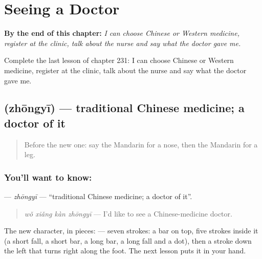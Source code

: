 
\chapter{Seeing a Doctor}
\label{ch:zh-seeing-a-doctor}

\begin{chapteropening}
\textbf{By the end of this chapter:} \emph{I can choose Chinese or Western medicine, register at the clinic, talk about the nurse and say what the doctor gave me.}

Complete the last lesson of chapter 231: I can choose Chinese or Western medicine, register at the clinic, talk about the nurse and say what the doctor gave me.
\end{chapteropening}

\section[\texorpdfstring{\zh{中医} (zhōngyī)}{中医 (zhōngyī)}]{ (zhōngyī) — traditional Chinese medicine; a doctor of it}

\label{lesson:ZH-C231-zhongyi}



\begin{quote}
Before the new one: say the Mandarin for a nose, then the Mandarin for a leg.
\end{quote}

\subsection*{You'll want to know: }
\textbf{} — \emph{zhōngyī} — \textquotedblleft{}traditional Chinese medicine; a doctor of it\textquotedblright{}.

\begin{quote}
\textbf{} \emph{wǒ xiǎng kàn zhōngyī} — I'd like to see a Chinese-medicine doctor.
\end{quote}

The new character, in pieces:  — seven strokes: a bar on top, five strokes inside it (a short fall, a short bar, a long bar, a long fall and a dot), then a stroke down the left that turns right along the foot. The next lesson puts it in your hand.

